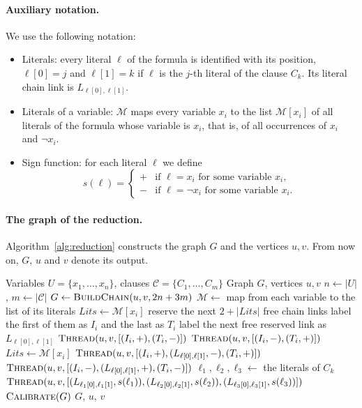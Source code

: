 \documentclass[a4paper,fleqn]{cas-sc}
\numberwithin{equation}{section}
\theoremstyle{definition}
\theoremstyle{plain}
\theoremstyle{remark}
\newcommand{\SSP}{\textsc{Separating Shortest Path}}
\newcommand{\ThreeSAT}{\textsc{3-SAT}}
\begin{document}
\paragraph{Auxiliary notation.}
We use the following notation:
\begin{itemize}
    \item Literals: every literal $\ell$ of the formula is identified with its position, $\ell[0] = j$ and $\ell[1] = k$ if $\ell$ is the $j$-th literal of the clause $C_k$.
    Its literal chain link is $L_{\ell[0],\ell[1]}$.
    \item Literals of a variable: $\mathcal{M}$ maps every variable $x_i$ to the list $\mathcal{M}[x_i]$ of all literals of the formula whose variable is $x_i$, that is, of all occurrences of $x_i$ and $\neg x_i$.
    \item Sign function: for each literal $\ell$ we define
\[
s(\ell) =
\begin{cases}
+ & \text{if $\ell = x_i$ for some variable $x_i$,}\\
- & \text{if $\ell = \neg x_i$ for some variable $x_i$.}
\end{cases}
\]
\end{itemize}

\paragraph{The graph of the reduction.}
Algorithm~\ref{alg:reduction} constructs the graph $G$ and the vertices $u,v$.
From now on, $G$, $u$ and $v$ denote its output.

\begin{algorithm}[H]
\caption{Reduction from \ThreeSAT{} to \SSP}
\label{alg:reduction}
\begin{algorithmic}[1]
\Require Variables $U=\{x_1,\dots,x_n\}$, clauses $\mathcal{C}=\{C_1,\dots,C_m\}$
\Ensure Graph $G$, vertices $u,v$
\State $n \gets |U|$, $m \gets |\mathcal{C}|$
\State $G \gets \textsc{BuildChain}(u,v,2n+3m)$
\State $\mathcal{M} \gets$ map from each variable to the list of its literals
    \State $\mathit{Lits} \gets \mathcal{M}[x_i]$
    \State reserve the next $2+|\mathit{Lits}|$ free chain links
    \State label the first of them as $I_i$ and the last as $T_i$
        \State label the next free reserved link as $L_{\ell[0],\ell[1]}$
    \EndFor
\EndFor
{}
    \State $\textsc{Thread}(u,v,[(I_i,+),(T_i,-)])$
    \State $\textsc{Thread}(u,v,[(I_i,-),(T_i,+)])$
    \State $\mathit{Lits} \gets \mathcal{M}[x_i]$
        \State $\textsc{Thread}(u,v,[(I_i,+),(L_{\ell[0],\ell[1]},-),(T_i,+)])$
        \State $\textsc{Thread}(u,v,[(I_i,-),(L_{\ell[0],\ell[1]},+),(T_i,-)])$
    \EndFor
\EndFor
{}
    \State $\ell_1,\ell_2,\ell_3 \gets$ the literals of $C_k$
    \State $\textsc{Thread}(u,v,[(L_{\ell_1[0],\ell_1[1]},s(\ell_1)),(L_{\ell_2[0],\ell_2[1]},s(\ell_2)),(L_{\ell_3[0],\ell_3[1]},s(\ell_3))])$
\EndFor
\State $\textsc{Calibrate}(G)$
\State \Return $G$, $u$, $v$
\end{algorithmic}
\end{algorithm}
\end{document}

